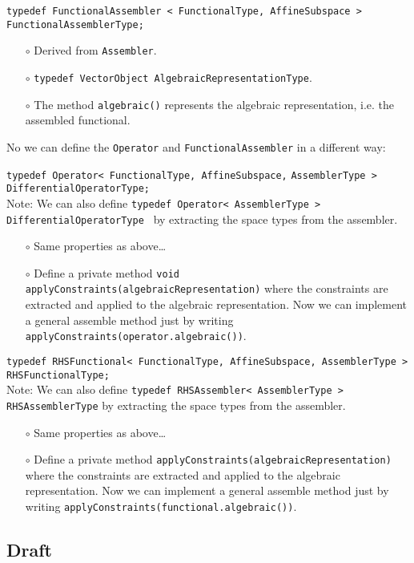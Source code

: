 \documentclass[a4paper,11pt]{article}
\numberwithin{equation}{section}
\newcommand{\CodeT}[1]{\textnormal{\texttt{#1}}}
\begin{document}
\noindent\CodeT{typedef FunctionalAssembler < FunctionalType, AffineSubspace >}\\
\CodeT{FunctionalAssemblerType;}
\begin{itemize}
	\item[$\circ$] Derived from \CodeT{Assembler}.
	\item[$\circ$] \CodeT{typedef VectorObject AlgebraicRepresentationType}.
	\item[$\circ$] The method \CodeT{algebraic()} represents the algebraic representation, i.e. the assembled functional.
\end{itemize}

\noindent No we can define the \CodeT{Operator} and \CodeT{FunctionalAssembler} in a different way:

\noindent\CodeT{typedef Operator< FunctionalType, AffineSubspace,}
\CodeT{AssemblerType > DifferentialOperatorType;}\\
Note: We can also define \CodeT{typedef Operator< AssemblerType > DifferentialOperatorType } by extracting the space types from the assembler.
\begin{itemize}
	\item[$\circ$] Same properties as above\ldots
	\item[$\circ$] Define a private method \CodeT{void applyConstraints(algebraicRepresentation)} where the constraints are extracted and applied to the algebraic representation. Now we can implement a general assemble method just by writing \CodeT{applyConstraints(operator.algebraic())}.
\end{itemize}

\noindent\CodeT{typedef RHSFunctional< FunctionalType, AffineSubspace, AssemblerType >}\\
\CodeT{RHSFunctionalType;}\\
Note: We can also define \CodeT{typedef RHSAssembler< AssemblerType > RHSAssemblerType} by extracting the space types from the assembler.
\begin{itemize}
	\item[$\circ$] Same properties as above\ldots
	\item[$\circ$] Define a private method \CodeT{applyConstraints(algebraicRepresentation)} where the constraints are extracted and applied to the algebraic representation. Now we can implement a general assemble method just by writing \CodeT{applyConstraints(functional.algebraic())}.	
\end{itemize}

\subsection{Draft}
\end{document}
